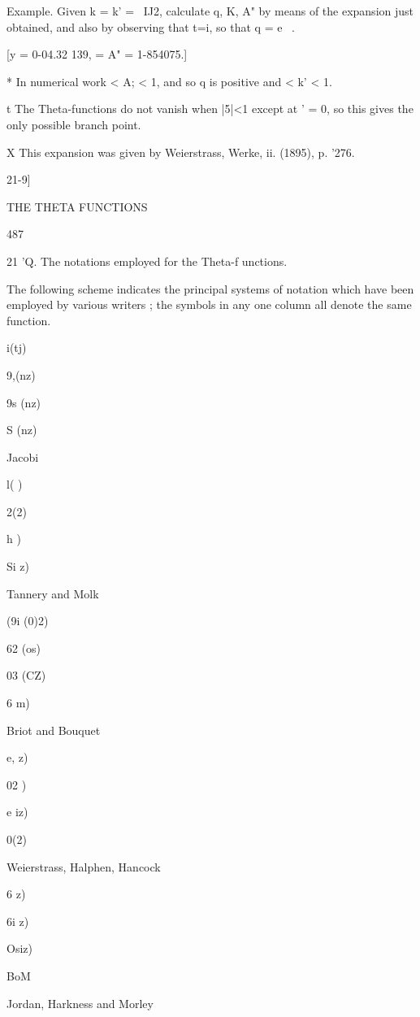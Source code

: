 Example. Given k = k' = \ IJ2, calculate q, K, A" by means of the expansion just 
obtained, and also by observing that t=i, so that q = e~  . 

[y = 0-04.32 139,  = A" = 1-854075.] 

* In numerical work < A; < 1, and so q is positive and <  k' < 1. 

t The Theta-functions do not vanish when |5|<1 except at '  = 0, so this gives the only 
possible branch point. 

X This expansion was given by Weierstrass, Werke, ii. (1895), p. '276. 



21-9] 



THE THETA FUNCTIONS 



487 



21 'Q. The notations employed for the Theta-f unctions. 

The following scheme indicates the principal systems of notation which have been 
employed by various writers ; the symbols in any one column all denote the same 
function. 



 i(tj) 


9,(nz) 


9s (nz) 


S (nz) 


Jacobi 


 l( ) 


 2(2) 


h  ) 


Si z) 


Tannery and Molk 


(9i (0)2) 


62 (os) 


03  (CZ) 


6 m) 


Briot and Bouquet 


e, z) 


02   ) 


e iz) 


 0(2) 


Weierstrass, Halphen, Hancock 


6 z) 


6i z) 


Osiz) 


BoM 


Jordan, Harkness and Morley 



